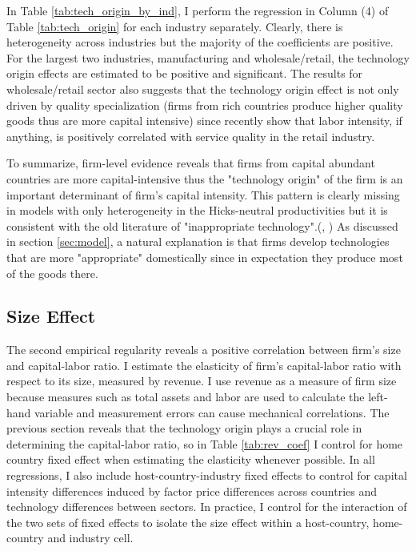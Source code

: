 \documentclass[notitlepage,11pt]{article}%
\begin{document}
In Table \ref{tab:tech_origin_by_ind}, I perform the regression in Column (4)
of Table \ref{tab:tech_origin} for each industry separately. Clearly, there is
heterogeneity across industries but the majority of the coefficients are
positive. For the largest two industries, manufacturing and wholesale/retail,
the technology origin effects are estimated to be positive and significant.
The results for wholesale/retail sector also suggests that the technology
origin effect is not only driven by quality specialization (firms from rich
countries produce higher quality goods thus are more capital intensive) since
\cite{nir_jaimovich_trading_2015} recently show that labor intensity, if
anything, is positively correlated with service quality in the retail industry.%

%


To summarize, firm-level evidence reveals that firms from capital abundant
countries are more capital-intensive thus the "technology origin" of the firm
is an important determinant of firm's capital intensity. This pattern is
clearly missing in models with only heterogeneity in the Hicks-neutral
productivities but it is consistent with the old literature of "inappropriate
technology".(\cite{mason_observations_1973}, \cite{morley_limited_1977}) As
discussed in section \ref{sec:model}, a natural explanation is that firms
develop technologies that are more "appropriate" domestically since in
expectation they produce most of the goods there. \ 

\subsection{Size Effect}

The second empirical regularity reveals a positive correlation between firm's
size and capital-labor ratio. I estimate the elasticity of firm's
capital-labor ratio with respect to its size, measured by revenue. I use
revenue as a measure of firm size because measures such as total assets and
labor are used to calculate the left-hand variable and measurement errors can
cause mechanical correlations. The previous section reveals that the
technology origin plays a crucial role in determining the capital-labor ratio,
so in Table \ref{tab:rev_coef} I control for home country fixed effect when
estimating the elasticity whenever possible. In all regressions, I also
include host-country-industry fixed effects to control for capital intensity
differences induced by factor price differences across countries and
technology differences between sectors. In practice, I control for the
interaction of the two sets of fixed effects to isolate the size effect within
a host-country, home-country and industry cell.
\end{document}
